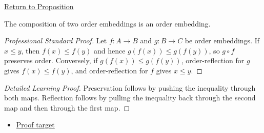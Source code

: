 \newpage
{}
\label{prf:composition-order-embeddings}

\begin{remark*}[Return]
\hyperref[prop:composition-order-embeddings]{Return to Proposition}
\end{remark*}

\begin{proposition*}
The composition of two order embeddings is an order embedding.
\end{proposition*}

\begin{proof}[Professional Standard Proof]
\LRAProofBodyStart
Let $f:A\to B$ and $g:B\to C$ be order embeddings. If $x\leq y$, then
$f(x)\leq f(y)$ and hence $g(f(x))\leq g(f(y))$, so $g\circ f$ preserves
order. Conversely, if $g(f(x))\leq g(f(y))$, order-reflection for $g$ gives
$f(x)\leq f(y)$, and order-reflection for $f$ gives $x\leq y$.
\end{proof}

\begin{proof}[Detailed Learning Proof]
\LRAProofBodyStart
Preservation follows by pushing the inequality through both maps. Reflection
follows by pulling the inequality back through the second map and then through
the first map.
\end{proof}
\begin{remark*}
\end{remark*}



\begin{dependencies}
\begin{itemize}
  \item \hyperref[prop:composition-order-embeddings]{Proof target}
\end{itemize}
\end{dependencies}

\clearpage

